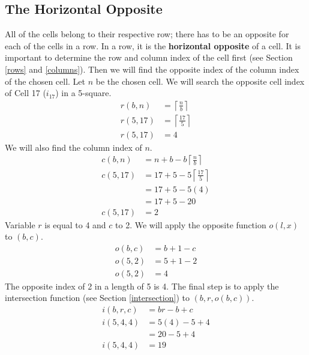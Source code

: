 \documentclass[letterpaper, twoside,12pt]{article}
\begin{document}
    \subsection{The Horizontal Opposite} \label{horizontal_opposite}
    All of the cells belong to their respective row; there has to be an opposite for each of the cells in a row. In a row, it is the \textbf{horizontal opposite} of a cell. It is important to determine the row and column index of the cell first (see Section \ref{rows} and \ref{columns}). Then we will find the opposite index of the column index of the chosen cell. Let $n$ be the chosen cell. We will search the opposite cell index of Cell 17 ($i_{17}$) in a 5-square.
    \begin{equation}
        \begin{split}
            r(b,n) &= \left\lceil \frac{n}{b}\right\rceil \\
            r(5,17) &= \left\lceil \frac{17}{5}\right\rceil \\
            r(5,17) &= 4
        \end{split}
    \end{equation}
    We will also find the column index of $n$.
    \begin{equation}
        \begin{split}
            c(b,n) &= n + b - b\left\lceil \frac{n}{b}\right\rceil \\
            c(5,17) &= 17 + 5 - 5\left\lceil \frac{17}{5}\right\rceil \\
                &= 17 + 5 - 5(4) \\
                &= 17 + 5 - 20 \\
            c(5,17) &= 2
        \end{split}
    \end{equation}
    Variable $r$ is equal to 4 and $c$ to 2. We will apply the opposite function $o(l,x)$ to $(b,c)$.
    \begin{equation}
        \begin{split}
            o(b,c) &= b + 1 - c \\
            o(5,2) &= 5 + 1 - 2 \\
            o(5,2) &= 4
        \end{split}
    \end{equation}
    The opposite index of 2 in a length of 5 is 4. The final step is to apply the intersection function (see Section \ref{intersection}) to $(b,r,o(b,c))$.
    \begin{equation}
        \begin{split}
            i(b,r,c) &= br - b + c \\
            i(5,4,4) &= 5(4) - 5 + 4 \\
                &= 20 - 5 + 4 \\
            i(5,4,4) &= 19 \\
        \end{split}
    \end{equation}
\end{document}

